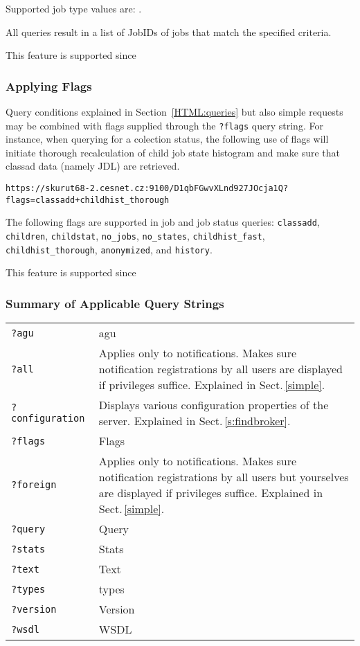 {\raggedright{}Supported job type values are: \jobtypenames.}

All queries result in a list of JobIDs of jobs that match the specified criteria.

This feature is supported since 

\subsubsection{Applying Flags}
\label{HTML:flags}

Query conditions explained in Section~\ref{HTML:queries} but also simple requests may be combined with flags supplied through the \texttt{?flags} query string. For instance, when querying for a colection status, the following use of flags will initiate thorough recalculation of child job state histogram and make sure that classad data (namely JDL) are retrieved.

\begin{verbatim}
https://skurut68-2.cesnet.cz:9100/D1qbFGwvXLnd927JOcja1Q?flags=classadd+childhist_thorough
\end{verbatim}

The following flags are supported in job and job status queries:
\texttt{classadd},
\texttt{children},
\texttt{childstat},
\texttt{no\_jobs},
\texttt{no\_states},
\texttt{childhist\_fast},
\texttt{childhist\_thorough},
\texttt{anonymized}, and
\texttt{history}.

This feature is supported since 



\subsubsection{Summary of Applicable Query Strings}
\label{HTML:querystrings}

\begin{tabularx}{\textwidth}{>{\tt}lX}
\texttt{?agu} & agu \\
\texttt{?all} & Applies only to notifications. Makes sure notification registrations by all users are displayed if privileges suffice. Explained in Sect.\,\ref{simple}. \\
\texttt{?configuration} & Displays various configuration properties of the server. Explained in Sect.\,\ref{s:findbroker}. \\
\texttt{?flags} & Flags \\
\texttt{?foreign} & Applies only to notifications. Makes sure notification registrations by all users but yourselves are displayed if privileges suffice. Explained in Sect.\,\ref{simple}. \\
\texttt{?query} & Query \\
\texttt{?stats} & Stats \\
\texttt{?text} & Text \\
\texttt{?types} & types \\
\texttt{?version} & Version \\
\texttt{?wsdl} & WSDL \\
\end{tabularx}

